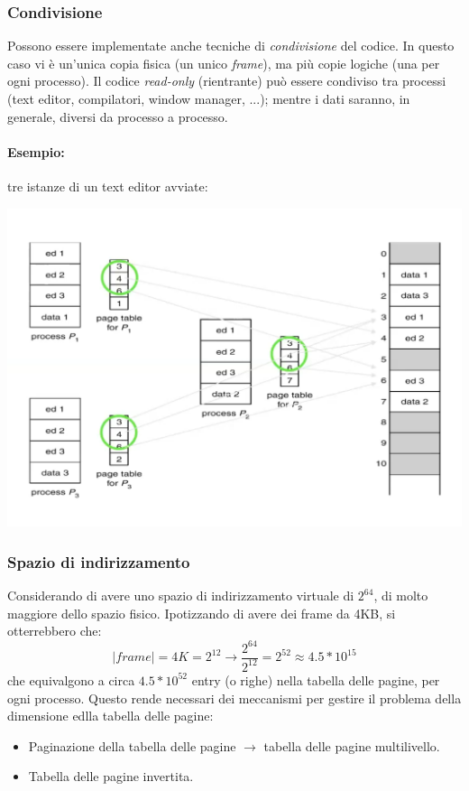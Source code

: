 \documentclass[a4paper,12pt, twoside]{report}
\begin{document}
\subsubsection{Condivisione}
Possono essere implementate anche tecniche di \emph{condivisione} del codice. In questo caso vi \`e un'unica
copia fisica (un unico \emph{frame}), ma pi\`u copie logiche (una per ogni processo). Il codice 
\emph{read-only} (rientrante) pu\`o essere condiviso tra processi (text editor, compilatori, window 
manager, ...); mentre i dati saranno, in generale, diversi da processo a processo.

\paragraph{Esempio:} tre istanze di un text editor avviate:
\begin{center}
\includegraphics[scale=0.215]{share_code}
\end{center}
\subsubsection{Spazio di indirizzamento}

Considerando di avere uno spazio di indirizzamento virtuale di $2^{64}$, di molto maggiore dello spazio 
fisico. Ipotizzando di avere dei frame da 4KB, si otterrebbero che:
\[ |frame| = 4K = 2^{12} \to \frac{2^{64}}{2^{12}} = 2^{52} \approx 4.5 * 10^{15}\]
che equivalgono a circa $4.5*10^{52}$ entry (o righe) nella tabella delle pagine, per ogni processo.
Questo rende necessari dei meccanismi per gestire il problema della dimensione edlla tabella delle pagine:
\begin{itemize}
    \item Paginazione della tabella delle pagine $\to$ tabella delle pagine multilivello.
    \item Tabella delle pagine invertita.
\end{itemize}
\end{document}
